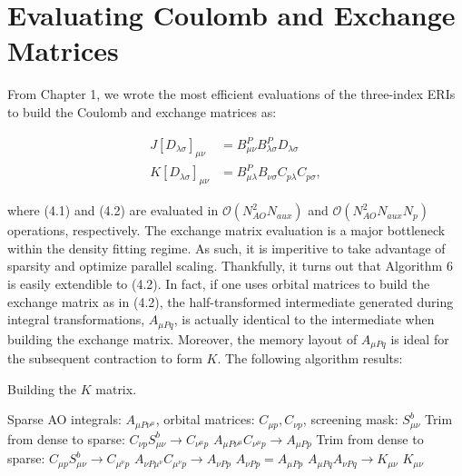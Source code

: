 \chapter{Evaluating Coulomb and Exchange Matrices}

From Chapter 1, we wrote the most efficient evaluations of the three-index ERIs to build the Coulomb and exchange matrices as:

\begin{align}
J[D_{\lambda \sigma}]_{\mu \nu} &= B_{\mu \nu}^P B_{\lambda \sigma}^PD_{\lambda \sigma} \\
K[D_{\lambda \sigma}]_{\mu \nu} &= B_{\mu \lambda}^P B_{\nu \sigma}C_{p\lambda}C_{p\sigma},
\end{align}

\noindent where (4.1) and (4.2) are evaluated in $\mathcal{O}(N_{AO}^2N_{aux})$ and $\mathcal{O}(N_{AO}^2N_{aux}N_p)$ operations, respectively.
The exchange matrix evaluation is a major bottleneck within the density fitting regime. As such, it is imperitive to take advantage of sparsity
and optimize parallel scaling. Thankfully, it turns out that Algorithm 6 is easily 
extendible to (4.2). In fact, if one uses orbital matrices to build the exchange matrix as in (4.2), the half-transformed 
intermediate generated during integral transformations, $A_{\mu Pq}$, is actually identical to the intermediate when building the exchange matrix. 
Moreover, the memory layout of $A_{\mu Pq}$ is ideal for the subsequent contraction to form $K$. The following algorithm results:

\begin{algorithm}[H]
\caption{Building the $K$ matrix.}
\begin{algorithmic}
\REQUIRE Sparse AO integrals: $A_{\mu P \nu^\mu}$, orbital matrices: $C_{\mu p}, C_{\nu p}$, screening mask: $S_{\mu \nu}^b$
    \STATE Trim from dense to sparse: $C_{\nu p}S_{\mu \nu}^b \rightarrow C_{\nu^{\mu} p}$
    \STATE $A_{\mu P \nu^{\mu}} C_{\nu^{\mu} p} \rightarrow A_{\mu Pp}$
        \STATE Trim from dense to sparse: $C_{\mu p}S_{\mu \nu}^b \rightarrow C_{\mu^{\nu} p}$
        \STATE $A_{\nu P \mu^{\nu}} C_{\mu^{\nu} p} \rightarrow A_{\nu P p}$
    \ELSE
        \STATE $A_{\nu P p} = A_{\mu P p}$ 
    \ENDIF
\ENDFOR
\STATE $A_{\mu P q} A_{\nu P q} \rightarrow K_{\mu \nu} $
\RETURN $K_{\mu \nu}$
\end{algorithmic}
\end{algorithm}

